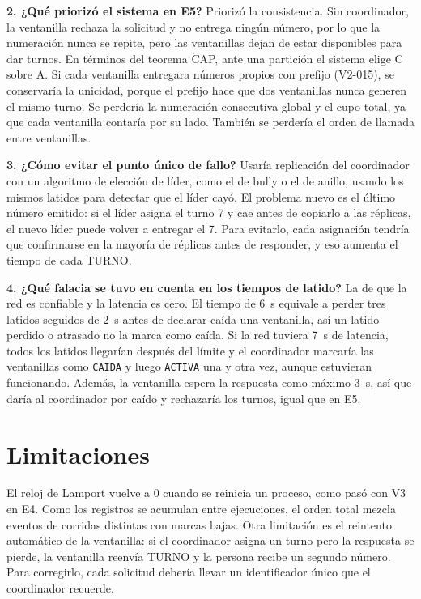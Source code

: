 \documentclass[11pt,a4paper]{article}
\begin{document}
\textbf{2. ¿Qué priorizó el sistema en E5?}
Priorizó la consistencia. Sin coordinador, la ventanilla rechaza la solicitud y no entrega ningún número, por lo que la numeración nunca se repite, pero las ventanillas dejan de estar disponibles para dar turnos. En términos del teorema CAP, ante una partición el sistema elige C sobre A. Si cada ventanilla entregara números propios con prefijo (V2-015), se conservaría la unicidad, porque el prefijo hace que dos ventanillas nunca generen el mismo turno. Se perdería la numeración consecutiva global y el cupo total, ya que cada ventanilla contaría por su lado. También se perdería el orden de llamada entre ventanillas.

\textbf{3. ¿Cómo evitar el punto único de fallo?}
Usaría replicación del coordinador con un algoritmo de elección de líder, como el de bully o el de anillo, usando los mismos latidos para detectar que el líder cayó. El problema nuevo es el último número emitido: si el líder asigna el turno 7 y cae antes de copiarlo a las réplicas, el nuevo líder puede volver a entregar el 7. Para evitarlo, cada asignación tendría que confirmarse en la mayoría de réplicas antes de responder, y eso aumenta el tiempo de cada TURNO.

\textbf{4. ¿Qué falacia se tuvo en cuenta en los tiempos de latido?}
La de que la red es confiable y la latencia es cero. El tiempo de 6~s equivale a perder tres latidos seguidos de 2~s antes de declarar caída una ventanilla, así un latido perdido o atrasado no la marca como caída. Si la red tuviera 7~s de latencia, todos los latidos llegarían después del límite y el coordinador marcaría las ventanillas como \texttt{CAIDA} y luego \texttt{ACTIVA} una y otra vez, aunque estuvieran funcionando. Además, la ventanilla espera la respuesta como máximo 3~s, así que daría al coordinador por caído y rechazaría los turnos, igual que en E5.

\section{Limitaciones}

El reloj de Lamport vuelve a 0 cuando se reinicia un proceso, como pasó con V3 en E4. Como los registros se acumulan entre ejecuciones, el orden total mezcla eventos de corridas distintas con marcas bajas. Otra limitación es el reintento automático de la ventanilla: si el coordinador asigna un turno pero la respuesta se pierde, la ventanilla reenvía TURNO y la persona recibe un segundo número. Para corregirlo, cada solicitud debería llevar un identificador único que el coordinador recuerde.
\end{document}
